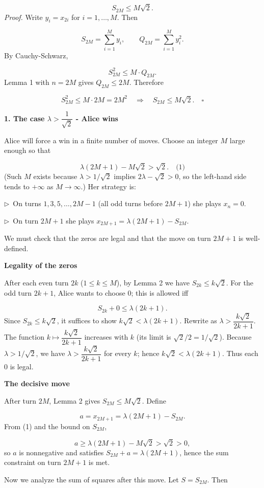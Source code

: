\documentclass{llmxive}
\providecommand{\solutionheading}[1]{\par\smallskip\noindent\textbf{#1}\par}
\providecommand{\compactbullet}[1]{\par\noindent$\triangleright$~#1\par}
\begin{document}
\[
S_{2M}\le M\sqrt{2}.
\]
\emph{Proof.} Write \(y_i=x_{2i}\) for \(i=1,\dots,M\). Then\par
\[
S_{2M} = \sum_{i=1}^M y_i, \qquad Q_{2M} = \sum_{i=1}^M y_i^2.
\]
By Cauchy-Schwarz,\par
\[
S_{2M}^2 \le M\cdot Q_{2M}.
\]
Lemma 1 with \(n=2M\) gives \(Q_{2M}\le 2M\). Therefore\par
\[
S_{2M}^2 \le M\cdot 2M = 2M^2 \quad\Longrightarrow\quad S_{2M}\le M\sqrt{2}. \quad\square
\]
\smallskip
\solutionheading{1. The case \(\lambda > \dfrac{1}{\sqrt{2}}\) - Alice wins}
Alice will force a win in a finite number of moves. Choose an integer \(M\) large enough so that\par
\[
\lambda(2M+1)-M\sqrt{2} > \sqrt{2}. \quad\text{(1)}
\]
(Such \(M\) exists because \(\lambda > 1/\sqrt{2}\) implies \(2\lambda-\sqrt{2}>0\), so the left-hand side tends to \(+\infty\) as \(M\to\infty\).) Her strategy is:\par
\compactbullet{On turns \(1,3,5,\dots,2M-1\) (all odd turns before \(2M+1\)) she plays \(x_n=0\).}
\compactbullet{On turn \(2M+1\) she plays \(x_{2M+1} = \lambda(2M+1)-S_{2M}\).}
We must check that the zeros are legal and that the move on turn \(2M+1\) is well-defined.\par
\solutionheading{Legality of the zeros}
After each even turn \(2k\) (\(1\le k\le M\)), by Lemma 2 we have \(S_{2k}\le k\sqrt{2}\). For the odd turn \(2k+1\), Alice wants to choose \(0\); this is allowed iff\par
\[
S_{2k}+0 \le \lambda(2k+1).
\]
Since \(S_{2k}\le k\sqrt{2}\), it suffices to show \(k\sqrt{2} < \lambda(2k+1)\). Rewrite as \(\lambda > \dfrac{k\sqrt{2}}{2k+1}\). The function \(k\mapsto \dfrac{k\sqrt{2}}{2k+1}\) increases with \(k\) (its limit is \(\sqrt{2}/2 = 1/\sqrt{2}\)). Because \(\lambda > 1/\sqrt{2}\), we have \(\lambda > \dfrac{k\sqrt{2}}{2k+1}\) for every \(k\); hence \(k\sqrt{2} < \lambda(2k+1)\). Thus each \(0\) is legal.\par
\solutionheading{The decisive move}
After turn \(2M\), Lemma 2 gives \(S_{2M}\le M\sqrt{2}\). Define\par
\[
a = x_{2M+1} = \lambda(2M+1)-S_{2M}.
\]
From (1) and the bound on \(S_{2M}\),\par
\[
a \ge \lambda(2M+1)-M\sqrt{2} > \sqrt{2} > 0,
\]
so \(a\) is nonnegative and satisfies \(S_{2M}+a = \lambda(2M+1)\), hence the sum constraint on turn \(2M+1\) is met.\par
Now we analyze the sum of squares after this move. Let \(S = S_{2M}\). Then\par
\end{document}
